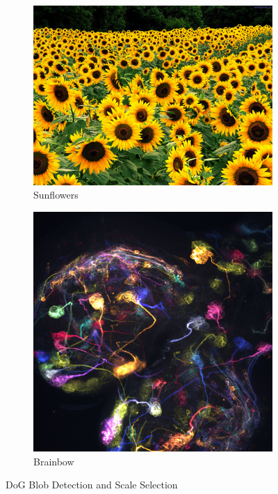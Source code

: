\begin{figure}[htbp]
	\centering
	\begin{subfigure}[t]{0.4\textwidth}
	    \centering
		\includegraphics[height=0.2\textheight]{hw3/problem1/sunflowers.png}
		\caption{Sunflowers}\label{fig:10a}
	\end{subfigure}
	\qquad
	\begin{subfigure}[t]{0.4\textwidth}
	    \centering
		\includegraphics[height=0.2\textheight]{hw3/problem1/drosophila_brainbow.png}
		\caption{Brainbow}\label{fig:10b}
	\end{subfigure}
	\caption{DoG Blob Detection and Scale Selection}\label{fig:10}
\end{figure}
